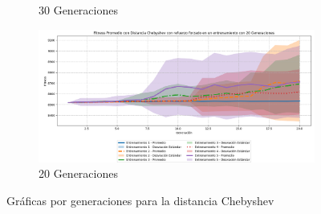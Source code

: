 \documentclass[lettersize, journal]{IEEEtran}
\begin{document}
\begin{figure}[ht]
\begin{subfigure}{0.3\textwidth}
        \caption{30 Generaciones}
        \label{fig:cheb_30gen}
    \end{subfigure}
    \hfill
    \begin{subfigure}{0.3\textwidth}
        \centering
        \includegraphics[width=\textwidth]{Chebyshev/Fitness_Acumulado_Cheby_20Gen.png}
        \caption{20 Generaciones}
        \label{fig:cheb_20gen}
    \end{subfigure}
    \caption{Gráficas por generaciones para la distancia Chebyshev}
    \label{fig:graficas_generales_chebyshev}
\end{figure}
\end{document}
